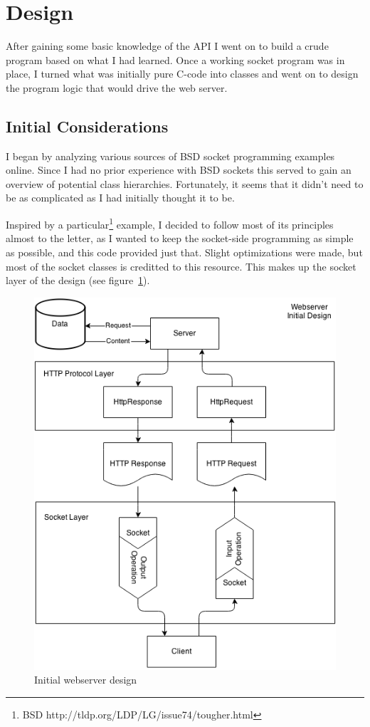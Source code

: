 \documentclass{acm_proc_article-sp}
\newcommand{\figref}[1]{(see figure~\ref{#1})}
\begin{document}
\section{Design}
\label{sec:design}
After gaining some basic knowledge of the API I went on to build a crude
program based on what I had learned. Once a working socket program was in
place, I turned what was initially pure C-code into classes and went on to
design the program logic that would drive the web server.

\subsection{Initial Considerations}
I began by analyzing various sources of BSD socket programming examples
online. Since I had no prior experience with BSD sockets this served to gain
an overview of potential class hierarchies. Fortunately, it seems that it
didn't need to be as complicated as I had initially thought it to be.

Inspired by a particular\footnote{BSD http://tldp.org/LDP/LG/issue74/tougher.html}
example, I decided to follow most of its principles almost to the letter, as
I wanted to keep the socket-side programming as simple as possible, and this
code provided just that. Slight optimizations were made, but most of the socket
classes is creditted to this resource. This makes up the socket layer of the
design \figref{fig:design}.

\begin{figure}[H]
    \includegraphics[scale=0.5]{figures/design.png}
    \caption{Initial webserver design}
    \label{fig:design}
\end{figure}
\end{document}
